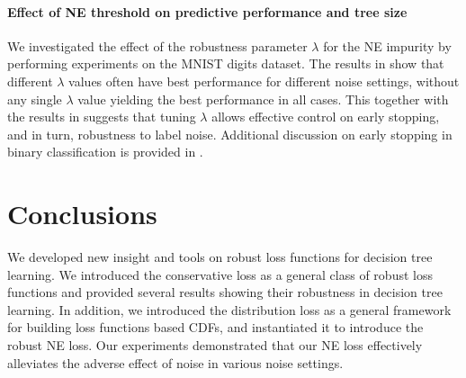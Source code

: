 \documentclass[letterpaper]{article} %
\begin{document}
\paragraph{Effect of NE threshold on predictive performance and tree size}
We investigated the effect of the robustness parameter $\lambda$ for the NE
impurity by performing experiments on 
the MNIST digits dataset. 
The results in  show that different $\lambda$ values
often have best performance for different noise settings, without any single
$\lambda$ value yielding the best performance in all cases.
This together with the results in  suggests that
tuning $\lambda$ allows effective control on early stopping, 
and in turn,
robustness to label noise.  
Additional discussion on early stopping in binary classification is provided in .


\section{Conclusions}

We developed new insight and tools on robust loss functions for decision tree learning.
We introduced the conservative loss as a general class of robust loss functions
and provided several results showing their robustness in decision tree learning.
In addition, we introduced the distribution loss as a general framework for
building loss functions based CDFs, and instantiated it to introduce the
robust NE loss.
Our experiments demonstrated that our NE loss effectively alleviates the adverse effect of 
noise in various noise settings.
\end{document}
